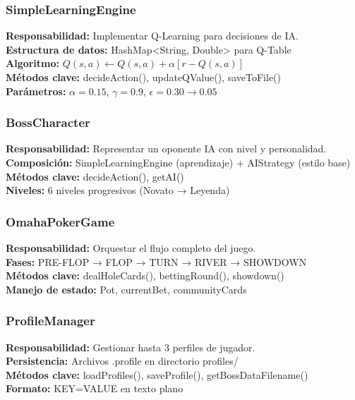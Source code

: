 \documentclass[12pt,a4paper]{article}
\begin{document}
\subsubsection{SimpleLearningEngine}
\textbf{Responsabilidad:} Implementar Q-Learning para decisiones de IA. \\
\textbf{Estructura de datos:} HashMap<String, Double> para Q-Table \\
\textbf{Algoritmo:} $Q(s,a) \leftarrow Q(s,a) + \alpha[r - Q(s,a)]$ \\
\textbf{Métodos clave:} decideAction(), updateQValue(), saveToFile() \\
\textbf{Parámetros:} $\alpha=0.15$, $\gamma=0.9$, $\epsilon=0.30 \rightarrow 0.05$

\subsubsection{BossCharacter}
\textbf{Responsabilidad:} Representar un oponente IA con nivel y personalidad. \\
\textbf{Composición:} SimpleLearningEngine (aprendizaje) + AIStrategy (estilo base) \\
\textbf{Métodos clave:} decideAction(), getAI() \\
\textbf{Niveles:} 6 niveles progresivos (Novato → Leyenda)

\subsubsection{OmahaPokerGame}
\textbf{Responsabilidad:} Orquestar el flujo completo del juego. \\
\textbf{Fases:} PRE-FLOP → FLOP → TURN → RIVER → SHOWDOWN \\
\textbf{Métodos clave:} dealHoleCards(), bettingRound(), showdown() \\
\textbf{Manejo de estado:} Pot, currentBet, communityCards

\subsubsection{ProfileManager}
\textbf{Responsabilidad:} Gestionar hasta 3 perfiles de jugador. \\
\textbf{Persistencia:} Archivos .profile en directorio profiles/ \\
\textbf{Métodos clave:} loadProfiles(), saveProfile(), getBossDataFilename() \\
\textbf{Formato:} KEY=VALUE en texto plano
\end{document}
